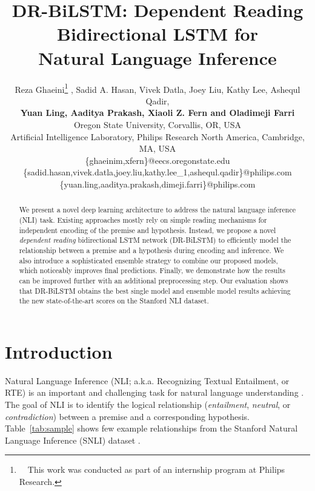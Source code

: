 \documentclass[11pt,a4paper]{article}
\title{DR-BiLSTM: Dependent Reading Bidirectional LSTM for \\ Natural Language Inference}
\author{
	Reza Ghaeini\thanks{\ \ This work was conducted as part of an internship program at Philips Research.} , Sadid A. Hasan, Vivek Datla, Joey Liu, Kathy Lee, Ashequl Qadir, \\ 
	\textbf{Yuan Ling, Aaditya Prakash, Xiaoli Z. Fern and Oladimeji Farri} \\
	Oregon State University, Corvallis, OR, USA \\
	Artificial Intelligence Laboratory, Philips Research North America, Cambridge, MA, USA \\
	\{ghaeinim,xfern\}@eecs.oregonstate.edu \\
	\{sadid.hasan,vivek.datla,joey.liu,kathy.lee\_1,ashequl.qadir\}@philips.com \\
	\{yuan.ling,aaditya.prakash,dimeji.farri\}@philips.com
}
\date{}
\begin{document}
	\maketitle
	\begin{abstract}		
		We present a novel deep learning architecture to address the natural language inference (NLI) task. Existing approaches mostly rely on simple reading mechanisms for independent encoding of the premise and hypothesis. Instead, we propose a novel \emph{dependent reading} bidirectional LSTM network (DR-BiLSTM) to efficiently model the relationship between a premise and a hypothesis during encoding and inference. We also introduce a sophisticated ensemble strategy to combine our proposed models, which noticeably improves final predictions. Finally, we demonstrate how the results can be improved further with an additional preprocessing step. Our evaluation shows that DR-BiLSTM obtains the best single model and ensemble model results achieving the new state-of-the-art scores on the Stanford NLI dataset.
		
	\end{abstract}
	
	\section{Introduction}
	Natural Language Inference (NLI; a.k.a. Recognizing Textual Entailment, or RTE) is an important and challenging task for natural language understanding \cite{nli}. The goal of NLI is to identify the logical relationship (\emph{entailment}, \emph{neutral}, or \emph{contradiction}) between a premise and a corresponding hypothesis. Table~\ref{tab:sample} shows few example relationships from the Stanford Natural Language Inference (SNLI) dataset \cite{snli}.
	
\end{document}
